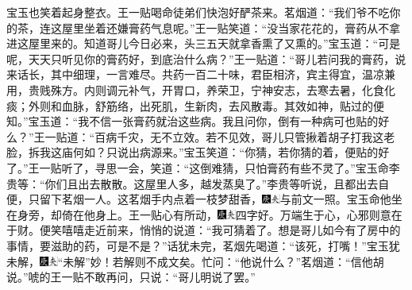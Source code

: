 宝玉也笑着起身整衣。王一贴喝命徒弟们快泡好酽茶来。茗烟道：“我们爷不吃你的茶，连这屋里坐着还嫌膏药气息呢。”王一贴笑道：“没当家花花的，膏药从不拿进这屋里来的。知道哥儿今日必来，头三五天就拿香熏了又熏的。”宝玉道：“可是呢，天天只听见你的膏药好，到底治什么病？”王一贴道：“哥儿若问我的膏药，说来话长，其中细理，一言难尽。共药一百二十味，君臣相济，宾主得宜，温凉兼用，贵贱殊方。内则调元补气，开胃口，养荣卫，宁神安志，去寒去暑，化食化痰；外则和血脉，舒筋络，出死肌，生新肉，去风散毒。其效如神，贴过的便知。”宝玉道：“我不信一张膏药就治这些病。我且问你，倒有一种病可也贴的好么？”王一贴道：“百病千灾，无不立效。若不见效，哥儿只管揪着胡子打我这老脸，拆我这庙何如？只说出病源来。”宝玉笑道：“你猜，若你猜的着，便贴的好了。”王一贴听了，寻思一会，笑道：“这倒难猜，只怕膏药有些不灵了。”宝玉命李贵等：“你们且出去散散。这屋里人多，越发蒸臭了。”李贵等听说，且都出去自便，只留下茗烟一人。这茗烟手内点着一枝梦甜香，{\includegraphics[width=3mm]{../Images/00004}\includegraphics[width=3mm]{../Images/00012}\footnotesize \kaishu 与前文一照。}宝玉命他坐在身旁，却倚在他身上。王一贴心有所动，{\includegraphics[width=3mm]{../Images/00004}\includegraphics[width=3mm]{../Images/00012}\footnotesize \kaishu 四字好。万端生于心，心邪则意在于财。}便笑嘻嘻走近前来，悄悄的说道：“我可猜着了。想是哥儿如今有了房中的事情，要滋助的药，可是不是？”话犹未完，茗烟先喝道：“该死，打嘴！”宝玉犹未解，{\includegraphics[width=3mm]{../Images/00004}\includegraphics[width=3mm]{../Images/00012}\footnotesize \kaishu “未解”妙！若解则不成文矣。}忙问：“他说什么？”茗烟道：“信他胡说。”唬的王一贴不敢再问，只说：“哥儿明说了罢。”

